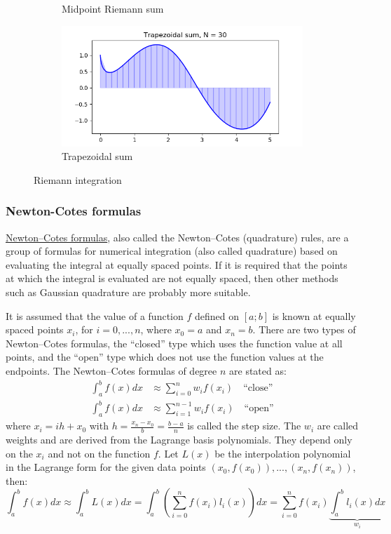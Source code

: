 \begin{figure}[H]
\begin{subfigure}[b]{0.45\textwidth}
        \caption{Midpoint Riemann sum}
    \end{subfigure}
    \begin{subfigure}[b]{0.45\textwidth}
        \includegraphics[width=\textwidth]{figure/riemann_trap.png}
        \caption{Trapezoidal sum}
    \end{subfigure}
    \caption{Riemann integration}
    \label{fig:Riemann_sum}
\end{figure}



\subsubsection{Newton-Cotes formulas}
\href{https://en.wikipedia.org/wiki/Newton-Cotes_formulas}{Newton–Cotes formulas}, also called the Newton–Cotes (quadrature) rules, are a group of formulas for numerical integration (also called quadrature) based on evaluating the integral at equally spaced points. If it is required that the points at which the integral is evaluated are not equally spaced, then other methods such as Gaussian quadrature are probably more suitable.

It is assumed that the value of a function $f$ defined on $[a;b]$ is known at equally spaced points $x_i$, for $i = 0, ..., n$, where $x_0 = a$ and $x_n = b$. There are two types of Newton–Cotes formulas, the ``closed'' type which uses the function value at all points, and the ``open'' type which does not use the function values at the endpoints. The Newton–Cotes formulas of degree $n$ are stated as:
\begin{align}
	\int_a^b f(x) dx &\approx \sum_{i=0}^{n} w_i f(x_i)   \quad \text{``close''} \\
	\int_a^b f(x) dx &\approx \sum_{i=1}^{n-1} w_i f(x_i) \quad \text{``open''}
\end{align}
where $x_i = ih + x_0$ with $h = \frac{x_n - x_0}{b} = \frac{b - a}{n}$ is called the step size. The $w_i$ are called weights and are derived from the Lagrange basis polynomials. They depend only on the $x_i$ and not on the function $f$. Let $L(x)$ be the interpolation polynomial in the Lagrange form for the given data points $(x_0, f(x_0)), ..., (x_n, f(x_n))$, then:
\begin{equation}
	\int_a^b f(x) dx \approx \int_a^b L(x) dx = \int_a^b \left( \sum_{i=0}^n f(x_i) l_i(x) \right) dx = \sum_{i=0}^n f(x_i) \underbrace{\int_a^b l_i(x) dx}_{w_i}
\end{equation}

